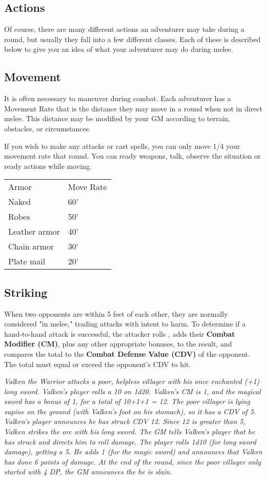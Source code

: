 \begin{multicols*}{2}
\section{Actions}
Of course, there are many different actions an adventurer may take during a round, but usually they fall into a few different classes. Each of these is described below to give you an idea of what your adventurer may do during melee.
\subsection{Movement}
\setlength{\columnsep}{0.25cm}
\begin{multicols*}{2}
It is often necessary to maneuver during combat. Each adventurer has a Movement Rate that is the distance they may move in a round when not in direct melee. This distance may be modified by your GM according to terrain, obstacles, or circumstances.

If you wish to make any attacks or cast spells, you can only move 1/4 your movement rate that round. You can ready weapons, talk, observe the situation or ready actions while moving.
\begin{normbox}
\begin{tabular}{@{}l l}
Armor & Move Rate\\
Naked & 60'\\
Robes & 50'\\
Leather armor & 40'\\
Chain armor & 30'\\
Plate mail & 20'\\
\end{tabular}
\end{normbox}

\end{multicols*}
\subsection{Striking}
When two opponents are within 5 feet of each other, they are normally considered "in melee," trading attacks with intent to harm. To determine if a hand-to-hand attack is successful, the attacker rolls , adds their \textbf{Combat Modifier (CM)}, plus any other appropriate bonuses, to the result, and compares the total to the \textbf{Combat Defense Value (CDV)} of the opponent. The total must equal or exceed the opponent's CDV to hit.

\textit{Valken the Warrior attacks a poor, helpless villager with his once enchanted (+1) long sword. Valken's player rolls a 10 on 1d20. Valken's CM is 1, and the magical sword has a bonus of 1, for a total of 10+1+1 = 12. The poor villager is lying supine on the ground (with Valken's foot on his stomach), so it has a CDV of 5. Valken's player announces he has struck CDV 12. Since 12 is greater than 5, Valken strikes the orc with his long sword. The GM tells Valken's player that he has struck and directs him to roll damage. The player rolls 1d10 (for long sword damage), getting a 5. He adds 1 (for the magic sword) and announces that Valken has done 6 points of damage. At the end of the round, since the poor villager only started with 4 DP, the GM announces the he is slain.}

\end{multicols*}

